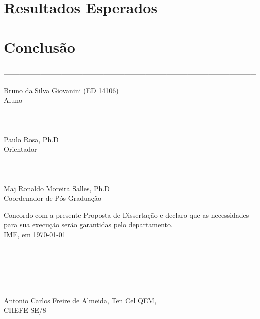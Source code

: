 \documentclass[a4paper, 12pt]{article}
\begin{document}
\newpage

\section{Resultados Esperados}
\label{sec:resultados}

\newpage

\section{Conclusão}
\label{sec:conclusao}

\newpage


 

\newpage

\begin{center}
\_\_\_\_\_\_\_\_\_\_\_\_\_\_\_\_\_\_\_\_\_\_\_\_\_\_\_\_\_\_\_\_\_\_\_\_\_\_\_\_\_\_\_\_\_\_\_\_\_\_\_ \\

Bruno da Silva Giovanini (ED 14106) \\Aluno \\ 
 
\hspace{4cm}
\\


\_\_\_\_\_\_\_\_\_\_\_\_\_\_\_\_\_\_\_\_\_\_\_\_\_\_\_\_\_\_\_\_\_\_\_\_\_\_\_\_\_\_\_\_\_\_\_\_\_\_\_ \\
Paulo Rosa, Ph.D \\Orientador \\ 

\hspace{4cm}
\\


\_\_\_\_\_\_\_\_\_\_\_\_\_\_\_\_\_\_\_\_\_\_\_\_\_\_\_\_\_\_\_\_\_\_\_\_\_\_\_\_\_\_\_\_\_\_\_\_\_\_\_ \\
Maj Ronaldo Moreira Salles, Ph.D \\Coordenador de Pós-Graduação \\

\hspace{4cm}

\end{center}
Concordo com a presente Proposta de Dissertação e declaro que as necessidades para sua execução serão garantidas pelo departamento. \\
IME, em \today
 \hspace{4cm}
 \\
 \\
 \\
 \\
 
\begin{center}
\_\_\_\_\_\_\_\_\_\_\_\_\_\_\_\_\_\_\_\_\_\_\_\_\_\_\_\_\_\_\_\_\_\_\_\_\_\_\_\_\_\_\_\_\_\_\_\_\_\_\_\_\_\_\_\_\_\_\_ \\
Antonio Carlos Freire de Almeida, Ten Cel QEM, \\
CHEFE SE/8
\end{center}
\end{document}
